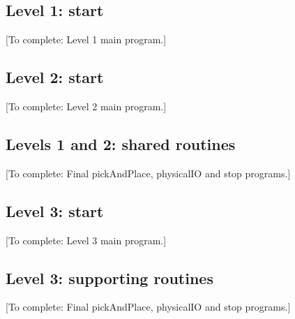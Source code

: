 \documentclass[11pt,a4paper]{article}
\newcommand{\todo}[1]{\textcolor{blue!60!black}{[To complete: #1]}}
\begin{document}
\subsection{Level 1: start}
\todo{Level 1 main program.}

\subsection{Level 2: start}
\todo{Level 2 main program.}

\subsection{Levels 1 and 2: shared routines}
\todo{Final pickAndPlace, physicalIO and stop programs.}

\subsection{Level 3: start}
\todo{Level 3 main program.}

\subsection{Level 3: supporting routines}
\todo{Final pickAndPlace, physicalIO and stop programs.}
\end{document}
